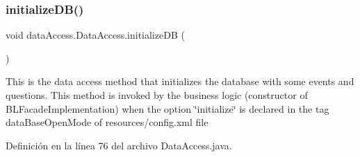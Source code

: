 \subsubsection{\texorpdfstring{initializeDB()}{initializeDB()}}
{\footnotesize\ttfamily void data\+Access.\+Data\+Access.\+initialize\+DB (\begin{DoxyParamCaption}{ }\end{DoxyParamCaption})}

This is the data access method that initializes the database with some events and questions. This method is invoked by the business logic (constructor of B\+L\+Facade\+Implementation) when the option \char`\"{}initialize\char`\"{} is declared in the tag data\+Base\+Open\+Mode of resources/config.\+xml file 

Definición en la línea 76 del archivo Data\+Access.\+java.


